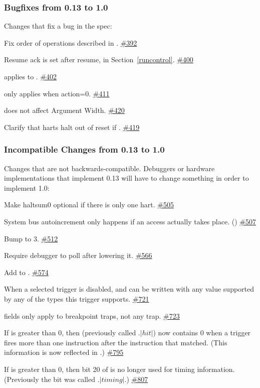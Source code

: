 \newcommand{\PR}[1]{\href{https://github.com/riscv/riscv-debug-spec/pull/#1}{\##1}}

\subsubsection{Bugfixes from 0.13 to 1.0}

\begin{steps}{Changes that fix a bug in the spec:}
    \item Fix order of operations described in \RdmSbdataZero. \PR{392}
    \item Resume ack is set after resume, in Section~\ref{runcontrol}. \PR{400}
    \item \FcsrTextraThirtytwoSselect applies to \FcsrTextraThirtytwoSvalue. \PR{402}
    \item \FcsrTcontrolMte only applies when action=0. \PR{411}
    \item \FacAccessmemoryAamsize does not affect Argument Width. \PR{420}
    \item Clarify that harts halt out of reset if . \PR{419}
\end{steps}

\subsubsection{Incompatible Changes from 0.13 to 1.0}

\begin{steps}{Changes that are not backwards-compatible. Debuggers or
hardware implementations that implement 0.13 will have to change something in
order to implement 1.0:}
    \item Make haltsum0 optional if there is only one hart. \PR{505}
    \item System bus autoincrement only happens if an access actually
    takes place. (\RdmSbdataZero) \PR{507}
    \item Bump \FdmDmstatusVersion to 3. \PR{512}
    \item Require debugger to poll \FdmDmcontrolDmactive after lowering it. \PR{566}
    \item Add \FcsrIcountPending to \RcsrIcount. \PR{574}
    \item When a selected trigger is disabled, \RcsrTdataTwo and \RcsrTdataThree
    can be written with any value supported by any of the types this trigger
    supports. \PR{721}
    \item \RcsrTcontrol fields only apply to breakpoint traps, not any trap. \PR{723}
    \item If \FcsrTinfoVersion is greater than 0, then \FcsrMcontrolSixHitZero
        (previously called \RcsrMcontrolSix.$|hit|$) now contains 0 when a trigger
        fires more than one instruction after the instruction that matched.  (This
        information is now reflected in \FcsrMcontrolSixHitOne.) \PR{795}
    \item If \FcsrTinfoVersion is greater than 0, then bit 20 of
        \RcsrMcontrolSix is no longer used for timing information. (Previously
        the bit was called \RcsrMcontrolSix.$|timing|$.) \PR{807}
\end{steps}

